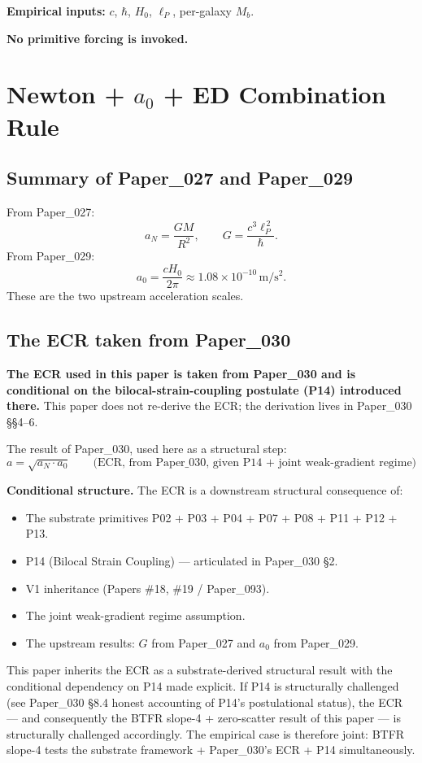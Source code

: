 \documentclass[11pt,a4paper]{article}
\begin{document}
\textbf{Empirical inputs:} $c$, $\hbar$, $H_0$, $\ell_P$, per-galaxy $M_b$.

\textbf{No primitive forcing is invoked.}

\section{Newton + $a_0$ + ED Combination Rule}

\subsection{Summary of Paper\_027 and Paper\_029}

From Paper\_027:
\[
a_N = \frac{GM}{R^2}, \qquad G = \frac{c^3 \ell_P^{\,2}}{\hbar}.
\]
From Paper\_029:
\[
a_0 = \frac{cH_0}{2\pi} \approx 1.08 \times 10^{-10}\,\mathrm{m/s^2}.
\]
These are the two upstream acceleration scales.

\subsection{The ECR taken from Paper\_030}

\textbf{The ECR used in this paper is taken from Paper\_030 and is conditional on the bilocal-strain-coupling postulate (P14) introduced there.} This paper does not re-derive the ECR; the derivation lives in Paper\_030 \S\S4--6.

The result of Paper\_030, used here as a structural step:
\[
\boxed{a = \sqrt{a_N \cdot a_0} \qquad \text{(ECR, from Paper\_030, given P14 + joint weak-gradient regime)}}
\]

\textbf{Conditional structure.} The ECR is a downstream structural consequence of:

\begin{itemize}[noitemsep]
\item The substrate primitives P02 + P03 + P04 + P07 + P08 + P11 + P12 + P13.
\item P14 (Bilocal Strain Coupling) --- articulated in Paper\_030 \S2.
\item V1 inheritance (Papers \#18, \#19 / Paper\_093).
\item The joint weak-gradient regime assumption.
\item The upstream results: $G$ from Paper\_027 and $a_0$ from Paper\_029.
\end{itemize}

This paper inherits the ECR as a substrate-derived structural result with the conditional dependency on P14 made explicit. If P14 is structurally challenged (see Paper\_030 \S8.4 honest accounting of P14's postulational status), the ECR --- and consequently the BTFR slope-4 + zero-scatter result of this paper --- is structurally challenged accordingly. The empirical case is therefore joint: BTFR slope-4 tests the substrate framework + Paper\_030's ECR + P14 simultaneously.
\end{document}
